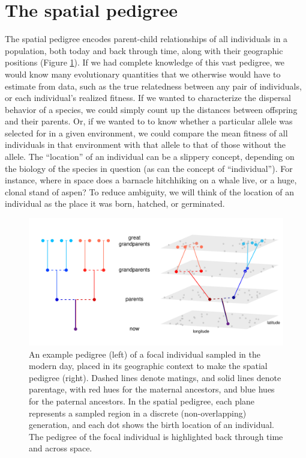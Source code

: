 \documentclass{ar-1col}
\begin{document}
\section{The spatial pedigree}

The spatial pedigree 
encodes parent-child relationships of all individuals in a population,
both today and back through time,
along with their geographic positions (Figure \ref{spatial_pedigree}).
If we had complete knowledge of this vast pedigree,
we would know many evolutionary quantities
that we otherwise would have to estimate from data,
such as the true relatedness between any pair of individuals,
or each individual's realized fitness.
If we wanted to characterize the dispersal behavior of a species,
we could simply count up the distances between offspring and their parents.
Or, if we wanted to to know whether a particular allele
was selected for in a given environment,
we could compare the mean fitness of all individuals in that environment with that allele
to that of those without the allele.
The ``location'' of an individual can be a slippery concept,
depending on the biology of the species in question
(as can the concept of ``individual'').
For instance, 
where in space does a barnacle hitchhiking on a whale live, 
or a huge, clonal stand of aspen?
To reduce ambiguity,
we will think of the location of an individual as the place it was
born, hatched, or germinated.

\begin{figure}
    \centering
         \includegraphics[width=\linewidth]{spatial_pedigree.pdf}
        \caption{
		An example pedigree (left) of a focal individual sampled in the modern day, 
	   	placed in its geographic context to make the spatial pedigree (right).
		Dashed lines denote matings, and solid lines denote parentage, 
		with red hues for the maternal ancestors, 
		and blue hues for the paternal ancestors.
		In the spatial pedigree, 
		each plane represents a sampled region in a discrete (non-overlapping) generation,
		and each dot shows the birth location of an individual.
		The pedigree of the focal individual is highlighted 
		back through time and across space.
        }
        \label{spatial_pedigree}
\end{figure}
\end{document}
